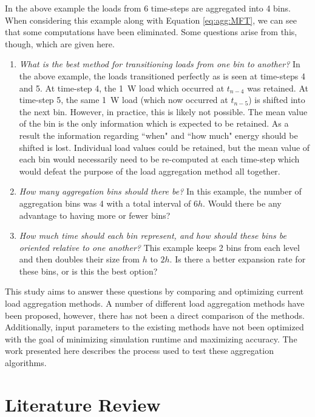 \documentclass[review,12pt]{elsarticle}
\begin{document}
In the above example the loads from 6 time-steps are aggregated into 4 bins. When considering this example along with Equation \ref{eq:agg:MFT}, we can see that some computations have been eliminated. Some questions arise from this, though, which are given here.

\begin{enumerate}
    \item \textit{What is the best method for transitioning loads from one bin to another?} In the above example, the loads transitioned perfectly as is seen at time-steps 4 and 5. At time-step 4, the \SI{1}{\watt} load which occurred at $t_{n-4}$ was retained. At time-step 5, the same \SI{1}{\watt} load (which now occurred at $t_{n-5}$) is shifted into the next bin. However, in practice, this is likely not possible. The mean value of the bin is the only information which is expected to be retained. As a result the information regarding ``when" and ``how much" energy should be shifted is lost. Individual load values could be retained, but the mean value of each bin would necessarily need to be re-computed at each time-step which would defeat the purpose of the load aggregation method all together.
    \item \textit{How many aggregation bins should there be?} In this example, the number of aggregation bins was 4 with a total interval of $6h$. Would there be any advantage to having more or fewer bins?
    \item \textit{How much time should each bin represent, and how should these bins be oriented relative to one another?} This example keeps 2 bins from each level and then doubles their size from $h$ to $2h$. Is there a better expansion rate for these bins, or is this the best option?
\end{enumerate}

This study aims to answer these questions by comparing and optimizing current load aggregation methods. A number of different load aggregation methods have been proposed, however, there has not been a direct comparison of the methods. Additionally, input parameters to the existing methods have not been optimized with the goal of minimizing simulation runtime and maximizing accuracy. The work presented here describes the process used to test these aggregation algorithms.

\section{Literature Review}
\end{document}
